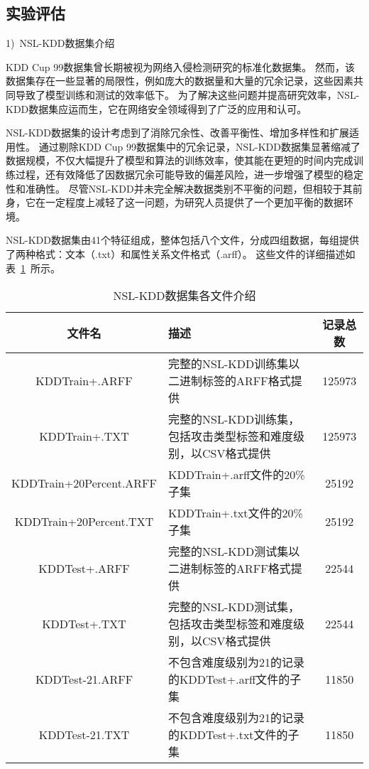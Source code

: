 \subsection{实验评估}
1)~NSL-KDD数据集介绍\par
KDD Cup 99数据集\cite{tavallaee2009detailed}曾长期被视为网络入侵检测研究的标准化数据集。
然而，该数据集存在一些显著的局限性，例如庞大的数据量和大量的冗余记录，这些因素共同导致了模型训练和测试的效率低下。
为了解决这些问题并提高研究效率，NSL-KDD数据集\cite{revathi2013detailed}应运而生，它在网络安全领域得到了广泛的应用和认可。


NSL-KDD数据集的设计考虑到了消除冗余性、改善平衡性、增加多样性和扩展适用性。
通过剔除KDD Cup 99数据集中的冗余记录，NSL-KDD数据集显著缩减了数据规模，不仅大幅提升了模型和算法的训练效率，使其能在更短的时间内完成训练过程，还有效降低了因数据冗余可能导致的偏差风险，进一步增强了模型的稳定性和准确性。
尽管NSL-KDD并未完全解决数据类别不平衡的问题，但相较于其前身，它在一定程度上减轻了这一问题，为研究人员提供了一个更加平衡的数据环境。


NSL-KDD数据集由41个特征组成，整体包括八个文件，分成四组数据，每组提供了两种格式：文本（.txt）和属性关系文件格式（.arff）。
这些文件的详细描述如表~\ref{tab:NSLKDDFile}~所示。
\begin{table}[htbp]
	\caption{NSL-KDD数据集各文件介绍}
	\label{tab:NSLKDDFile}
	\begin{tabularx}{\textwidth}{cXc}
		\toprule
		\textbf{文件名}            & \textbf{描述}                          & \textbf{记录总数} \\
		\midrule
		KDDTrain+.ARFF          & 完整的NSL-KDD训练集以二进制标签的ARFF格式提供         & 125973        \\
		KDDTrain+.TXT           & 完整的NSL-KDD训练集，包括攻击类型标签和难度级别，以CSV格式提供 & 125973        \\
		KDDTrain+20Percent.ARFF & KDDTrain+.arff文件的20\%子集              & 25192         \\
		KDDTrain+20Percent.TXT  & KDDTrain+.txt文件的20\%子集               & 25192         \\
		KDDTest+.ARFF           & 完整的NSL-KDD测试集以二进制标签的ARFF格式提供         & 22544         \\
		KDDTest+.TXT            & 完整的NSL-KDD测试集，包括攻击类型标签和难度级别，以CSV格式提供 & 22544         \\
		KDDTest-21.ARFF         & 不包含难度级别为21的记录的KDDTest+.arff文件的子集     & 11850         \\
		KDDTest-21.TXT          & 不包含难度级别为21的记录的KDDTest+.txt文件的子集      & 11850         \\
		\bottomrule
	\end{tabularx}
\end{table}

